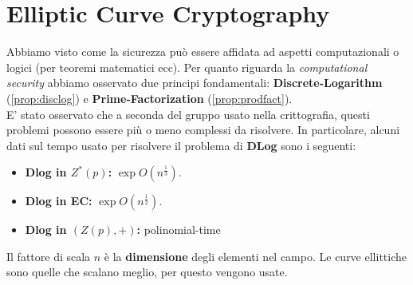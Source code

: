 \chapter{Elliptic Curve Cryptography}
Abbiamo visto come la sicurezza può essere affidata ad aspetti computazionali o logici (per teoremi matematici ecc). Per quanto riguarda la \textit{computational security} abbiamo osservato due principi fondamentali: \textbf{Discrete-Logarithm} (\cref{prop:disclog}) e \textbf{Prime-Factorization} (\cref{prop:prodfact}).\\
E' stato osservato che a seconda del gruppo usato nella crittografia, questi problemi possono essere più o meno complessi da risolvere. In particolare, alcuni dati sul tempo usato per risolvere il problema di \textbf{DLog} sono i seguenti:
\begin{itemize}
    \item \textbf{Dlog in $Z^*(p)$:} $\exp{O(n^{\frac{1}{3}})}$.
    \item \textbf{Dlog in EC:} $\exp{O(n^{\frac{1}{2}})}$.
    \item \textbf{Dlog in $(Z(p),+)$:} polinomial-time
\end{itemize}
\begin{note}
Il fattore di scala $n$ è la \textbf{dimensione} degli elementi nel campo. Le curve ellittiche sono quelle che scalano meglio, per questo vengono usate.
\end{note}
